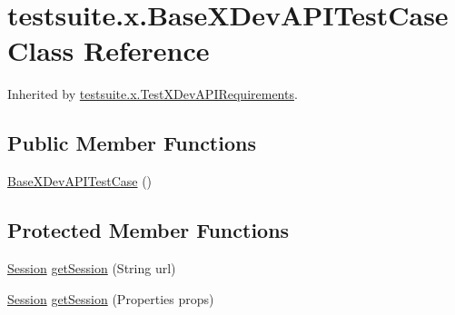 \hypertarget{classtestsuite_1_1x_1_1_base_x_dev_a_p_i_test_case}{}\section{testsuite.\+x.\+Base\+X\+Dev\+A\+P\+I\+Test\+Case Class Reference}
\label{classtestsuite_1_1x_1_1_base_x_dev_a_p_i_test_case}


Inherited by \mbox{\hyperlink{classtestsuite_1_1x_1_1_test_x_dev_a_p_i_requirements}{testsuite.\+x.\+Test\+X\+Dev\+A\+P\+I\+Requirements}}.

\subsection*{Public Member Functions}
\begin{DoxyCompactItemize}
\item 
\mbox{\hyperlink{classtestsuite_1_1x_1_1_base_x_dev_a_p_i_test_case_ad943b876db31d0e1bb386c89b2b135fa}{Base\+X\+Dev\+A\+P\+I\+Test\+Case}} ()
\end{DoxyCompactItemize}
\subsection*{Protected Member Functions}
\begin{DoxyCompactItemize}
\item 
\mbox{\hyperlink{interfacecom_1_1mysql_1_1cj_1_1xdevapi_1_1_session}{Session}} \mbox{\hyperlink{classtestsuite_1_1x_1_1_base_x_dev_a_p_i_test_case_a61c03b936df28ace5d4458def5252eb7}{get\+Session}} (String url)
\item 
\mbox{\hyperlink{interfacecom_1_1mysql_1_1cj_1_1xdevapi_1_1_session}{Session}} \mbox{\hyperlink{classtestsuite_1_1x_1_1_base_x_dev_a_p_i_test_case_a362d347ff4b2c8f0a44262d2f57e534b}{get\+Session}} (Properties props)
\end{DoxyCompactItemize}
